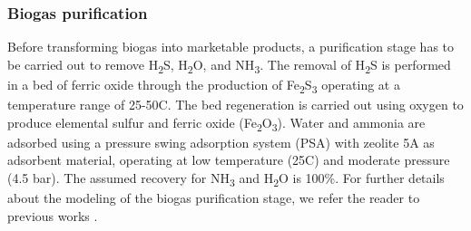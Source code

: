 \documentclass[authoryear]{elsarticle}
\begin{document}
%
%	

\subsubsection{Biogas purification}
Before transforming biogas into marketable products, a purification stage has to be carried out to remove H\textsubscript{2}S, H\textsubscript{2}O, and NH\textsubscript{3}. The removal of H\textsubscript{2}S is performed in a bed of ferric oxide through the production of Fe\textsubscript{2}S\textsubscript{3} operating at a temperature range of 25-50\textdegree C. The bed regeneration is carried out using oxygen to produce elemental sulfur and ferric oxide (Fe\textsubscript{2}O\textsubscript{3}). Water and ammonia are adsorbed using a pressure swing adsorption system (PSA) with zeolite 5A as adsorbent material, operating at low temperature (25\textdegree C) and moderate pressure (4.5 bar). The assumed recovery for NH\textsubscript{3} and H\textsubscript{2}O is 100\%. For further details about the modeling of the biogas purification stage, we refer the reader to previous works \citep{Leon, MartinHernandez}.
\end{document}
